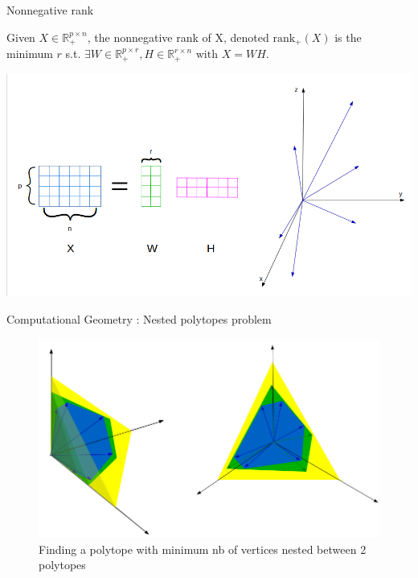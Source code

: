 \begin{frame}{Nonnegative rank}
\begin{defn}
Given $X \in \mathbb{R}_+^{p\times n}$, the nonnegative rank of X, denoted $\text{rank}_+(X)$ is the minimum $r$ s.t. $\exists W \in \mathbb{R}_+^{p\times r}, H \in \mathbb{R}_+^{r\times n} \text{ with } X = WH$.
\end{defn}
\centering
\includegraphics[scale=0.28]{Section4/NMFvect.png}
\end{frame}
\begin{frame}{Computational Geometry : Nested polytopes problem}
\begin{figure}
\centering
\includegraphics[scale=0.35]{Section4/polytopeGeo.png}
\caption{\footnotesize Finding a polytope with minimum nb of vertices nested between 2 polytopes}
\end{figure}
\end{frame}

